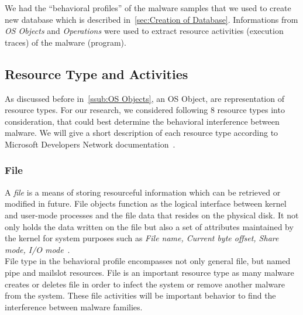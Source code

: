 We had the ``behavioral profiles'' of the malware samples that we used to create new database which is described in~\autoref{sec:Creation of Database}.
Informations from \emph{OS Objects} and \emph{Operations} were used to extract resource activities (execution traces) of the malware (program).

\subsection{Resource Type and Activities}
\label{sub:Resource Types and Activities}
As discussed before in~\autoref{ssub:OS Objects}, an OS Object, are representation of resource types.
For our research, we considered following 8 resource types into consideration, that could best determine the behavioral interference between malware.
We will give a short description of each resource type according to Microsoft Developers Network documentation~\cite[MSDN]{msdn}.
\subsubsection{File}
\label{ssub:File}
A \emph{file} is a means of storing resourceful information which can be retrieved or modified in future.
File objects function as the logical interface between kernel and user-mode processes and the file data that resides on the physical disk.
It not only holds the data written on the file but also a set of attributes maintained by the kernel for system purposes such as \emph{File name, Current byte offset, Share mode, I/O mode}~\cite[]{msfile}.\\
File type in the behavioral profile encompasses not only general file, but named pipe and mailslot resources.
File is an important resource type as many malware creates or deletes file in order to infect the system or remove another malware from the system.
These file activities will be important behavior to find the interference between malware families.

